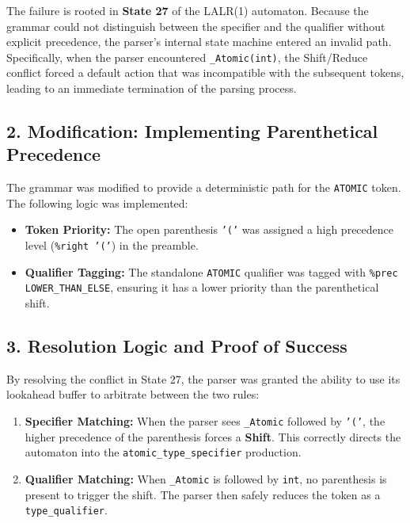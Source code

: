 \documentclass{article}
\begin{document}
The failure is rooted in \textbf{State 27} of the LALR(1) automaton. Because the grammar could not distinguish between the specifier and the qualifier without explicit precedence, the parser's internal state machine entered an invalid path. Specifically, when the parser encountered \texttt{\_Atomic(int)}, the Shift/Reduce conflict forced a default action that was incompatible with the subsequent tokens, leading to an immediate termination of the parsing process.

\subsection{2. Modification: Implementing Parenthetical Precedence}

The grammar was modified to provide a deterministic path for the \texttt{ATOMIC} token. The following logic was implemented:

\begin{itemize}
    \item \textbf{Token Priority:} The open parenthesis \texttt{'('} was assigned a high precedence level (\texttt{\%right '('}) in the preamble.
    \item \textbf{Qualifier Tagging:} The standalone \texttt{ATOMIC} qualifier was tagged with \texttt{\%prec LOWER\_THAN\_ELSE}, ensuring it has a lower priority than the parenthetical shift.
\end{itemize}

\subsection{3. Resolution Logic and Proof of Success}

By resolving the conflict in State 27, the parser was granted the ability to use its lookahead buffer to arbitrate between the two rules:

\begin{enumerate}
    \item \textbf{Specifier Matching:} When the parser sees \texttt{\_Atomic} followed by \texttt{'('}, the higher precedence of the parenthesis forces a \textbf{Shift}. This correctly directs the automaton into the \texttt{atomic\_type\_specifier} production.
    \item \textbf{Qualifier Matching:} When \texttt{\_Atomic} is followed by \texttt{int}, no parenthesis is present to trigger the shift. The parser then safely reduces the token as a \texttt{type\_qualifier}.
\end{enumerate}
\end{document}
